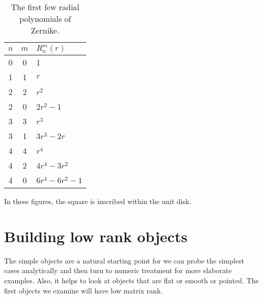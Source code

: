 \begin{table}[htdp]
\begin{center}
\begin{tabular}{ccl}
 $n$ & $m$ & $R_{n}^{m}(r)$ \\\hline\hline
 0 & 0 & 1 \\\hline
 1 & 1 & $r$ \\\hline
 2 & 2 & $r^{2}$ \\
 2 & 0 & $2r^{2} - 1$ \\\hline
 3 & 3 & $r^{3}$ \\
 3 & 1 & $3r^{3} - 2r$ \\ \hline
 4 & 4 & $r^{4}$ \\
 4 & 2 & $4r^{4} - 3r^{2}$ \\
 4 & 0 & $6r^{4} - 6r^{2} - 1$\\
\end{tabular}
\end{center}
\caption[The first few radial polynomials of Zernike]{The first few radial polynomials of Zernike.}
\label{tab:9:radial}
\end{table}%

In these figures, the square is inscribed within the unit disk.

\break
\clearpage

\section{Building low rank objects}
The simple objects are a natural starting point for we can probe the simplest cases analytically and then turn to numeric treatment for more elaborate examples. Also, it helps to look at objects that are flat or smooth or pointed. The first objects we examine will have low matrix rank.

